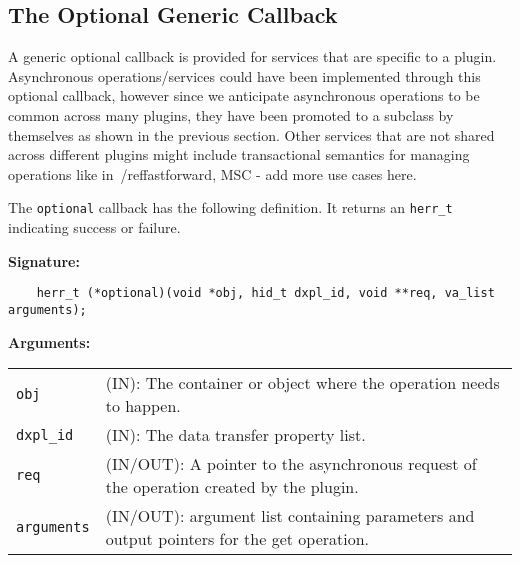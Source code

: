\subsection{The Optional Generic Callback}
A generic optional callback is provided for services that are specific to a plugin. Asynchronous operations/services could have been implemented through this optional callback, however since we anticipate asynchronous operations to be common across many plugins, they have been promoted to a subclass by themselves as shown in the previous section. Other services that are not shared across different plugins might include transactional semantics for managing operations like in~/ref{fastforward}, MSC - add more use cases here.

The \texttt{optional} callback has the following definition. It returns an \texttt{herr\_t} indicating success or failure.\bigskip 

\begin{mdframed}[style=bgbox]
\textbf{Signature:}
\begin{lstlisting}
    herr_t (*optional)(void *obj, hid_t dxpl_id, void **req, va_list arguments);
\end{lstlisting}

\textbf{Arguments:}\\
\begin{tabular}{l p{13.5cm}}
  \texttt{obj} & (IN): The container or object where the operation needs to happen.\\
  \texttt{dxpl\_id} & (IN): The data transfer property list.\\
  \texttt{req} & (IN/OUT): A pointer to the asynchronous request of the operation created by the plugin.\\
  \texttt{arguments} & (IN/OUT): argument list containing parameters and output pointers for the get operation. \\
\end{tabular}
\end{mdframed}

